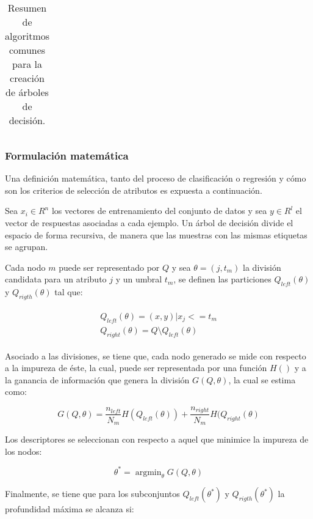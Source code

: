 \begin{longtable}[c]{|l|l|}
	\caption{Resumen de algoritmos comunes para la creación de árboles de decisión. }
	\label{tab:summary-alg-trees}\\
\end{longtable}

\subsubsection{Formulación matemática}

Una definición matemática, tanto del proceso de clasificación o regresión y cómo son los criterios de selección de atributos es expuesta a continuación.

Sea $x_{i} \in R^{n}$ los vectores de entrenamiento del conjunto de datos y sea $y \in R^l$ el vector de respuestas asociadas a cada ejemplo. Un árbol de decisión divide el espacio de forma recursiva, de manera que las muestras con las mismas etiquetas se agrupan.

Cada nodo $m$ puede ser representado por $Q$ y sea $\theta = (j, t_{m})$ la división candidata para un atributo $j$ y un umbral $t_{m}$, se definen las particiones $Q_{left}(\theta)$ y $Q_{rigth}(\theta)$ tal que:

\begin{align}
	\begin{aligned}
		Q_{left}(\theta) = {(x, y) | x_j <= t_m}\\Q_{right}(\theta) = Q \setminus Q_{left}(\theta)
	\end{aligned}
\end{align}
 

Asociado a las divisiones, se tiene que, cada nodo generado se mide con respecto a la impureza de éste, la cual, puede ser representada por una función $H()$ y a la ganancia de información que genera la división $G(Q, \theta)$, la cual se estima como:

\begin{equation}
	G(Q, \theta) = \frac{n_{left}}{N_m} H(Q_{left}(\theta)) + \frac{n_{right}}{N_m} H(Q_{right}(\theta)
\end{equation}

Los descriptores se seleccionan con respecto a aquel que minimice la impureza de los nodos:

\begin{equation}
	\theta^* = \operatorname{argmin}_\theta  G(Q, \theta)
\end{equation}

Finalmente, se tiene que para los subconjuntos $Q_{left}(\theta^*)$ y $Q_{rigth}(\theta^*)$ la profundidad máxima se alcanza si:

